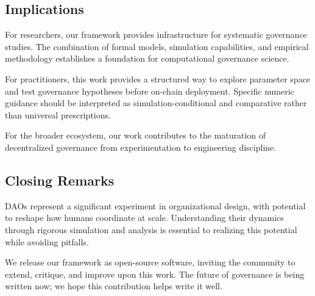 \subsection{Implications}

For researchers, our framework provides infrastructure for systematic governance studies. The combination of formal models, simulation capabilities, and empirical methodology establishes a foundation for computational governance science.

For practitioners, this work provides a structured way to explore parameter space and test governance hypotheses before on-chain deployment. Specific numeric guidance should be interpreted as simulation-conditional and comparative rather than universal prescriptions.

For the broader ecosystem, our work contributes to the maturation of decentralized governance from experimentation to engineering discipline.

\subsection{Closing Remarks}

DAOs represent a significant experiment in organizational design, with potential to reshape how humans coordinate at scale. Understanding their dynamics through rigorous simulation and analysis is essential to realizing this potential while avoiding pitfalls.

We release our framework as open-source software, inviting the community to extend, critique, and improve upon this work. The future of governance is being written now; we hope this contribution helps write it well.

